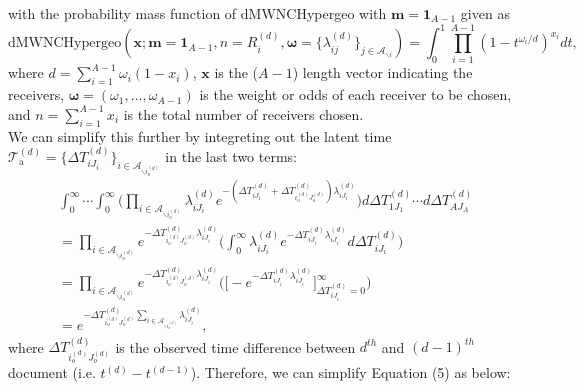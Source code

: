 \documentclass[a4paper]{article}
\begin{document}
with the probability mass function of dMWNCHypergeo with $\boldsymbol{m} =\mathbf{1}_{A-1}$ given as
\begin{equation*}
\mbox{dMWNCHypergeo}(\boldsymbol{x}; \boldsymbol{m} =\mathbf{1}_{A-1}, n = R_i^{(d)}, \boldsymbol{\omega} = \{\lambda_{ij}^{(d)}\}_{j \in \mathcal{A}_{\backslash i}}) = \int_0^1\prod_{i=1}^{A-1}(1-t^{\omega_i / d})^{x_i}dt,
\end{equation*}
where $d = \sum_{i = 1}^{A-1} \omega_i(1-x_i)$, $\boldsymbol{x}$ is the ($A-1$) length vector indicating the receivers, $\boldsymbol{\omega} =(\omega_1,...,\omega_{A-1})$ is the weight or odds of each receiver to be chosen, and $n = \sum_{i= 1} ^{A-1} x_i$ is the total number of receivers chosen. 
\\ \newline
We can simplify this further by integreting out the latent time $\mathcal{T}^{(d)}_{\mbox{a}}=\{\Delta T^{(d)}_{iJ_i}\}_{i \in \mathcal{A}_{\backslash i_o^{(d)}}}$ in the last two terms:
\begin{equation}
\begin{aligned}
&\int_{0}^\infty\cdots\int_{0}^\infty \Big(\prod_{i\in \mathcal{A}_{\backslash i_o^{(d)}}} \lambda^{(d)}_{iJ_i}e^{-(\Delta T^{(d)}_{iJ_i} + \Delta T^{(d)}_{i_o^{(d)}J_o^{(d)}})\lambda^{(d)}_{iJ_i}} \Big)d\Delta T^{(d)}_{1J_1}\cdots d\Delta T^{(d)}_{AJ_A}\\&
= \prod_{i\in \mathcal{A}_{\backslash i_o^{(d)}}} e^{- \Delta T^{(d)}_{i_o^{(d)}J_o^{(d)}}\lambda^{(d)}_{iJ_i}} \Big(\int_{0}^\infty \lambda^{(d)}_{iJ_i}e^{-\Delta T^{(d)}_{iJ_i} \lambda^{(d)}_{iJ_i}}  d\Delta T^{(d)}_{iJ_i}\Big)
\\& =\prod_{i\in \mathcal{A}_{\backslash i_o^{(d)}}} e^{- \Delta T^{(d)}_{i_o^{(d)}J_o^{(d)}}\lambda^{(d)}_{iJ_i}} \Big(\Big [ - e^{-\Delta T^{(d)}_{iJ_i} \lambda^{(d)}_{iJ_i}}\Big]_{\Delta T^{(d)}_{iJ_i}  = 0} ^{\infty}\Big)
\\& = e^{- \Delta T^{(d)}_{i_o^{(d)}J_o^{(d)}}\sum_{i\in \mathcal{A}_{\backslash i_o^{(d)}}}\lambda^{(d)}_{iJ_i}},
\end{aligned}
\end{equation}
where $\Delta T^{(d)}_{i_o^{(d)}J_o^{(d)}}$ is the observed time difference between $d^{th}$ and $(d-1)^{th}$ document (i.e. $t^{(d)}-t^{(d-1)}$).
Therefore, we can simplify Equation (5) as below:
\end{document}
